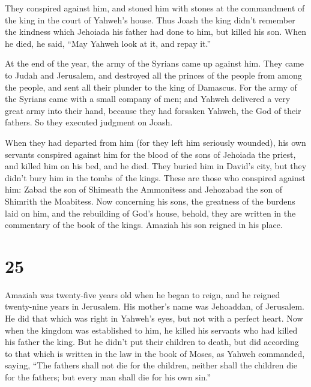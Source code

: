  They conspired against him, and stoned him with stones
at the commandment of the king in the court of Yahweh's house.
 Thus Joash the king didn't remember the kindness which
Jehoiada his father had done to him, but killed his son. When he died,
he said, ``May Yahweh look at it, and repay it.''

 At the end of the year, the army of the Syrians came up
against him. They came to Judah and Jerusalem, and destroyed all the
princes of the people from among the people, and sent all their plunder
to the king of Damascus.  For the army of the Syrians
came with a small company of men; and Yahweh delivered a very great army
into their hand, because they had forsaken Yahweh, the God of their
fathers. So they executed judgment on Joash.

 When they had departed from him (for they left him
seriously wounded), his own servants conspired against him for the blood
of the sons of Jehoiada the priest, and killed him on his bed, and he
died. They buried him in David's city, but they didn't bury him in the
tombs of the kings.  These are those who conspired
against him: Zabad the son of Shimeath the Ammonitess and Jehozabad the
son of Shimrith the Moabitess.  Now concerning his sons,
the greatness of the burdens laid on him, and the rebuilding of God's
house, behold, they are written in the commentary of the book of the
kings. Amaziah his son reigned in his place.

\hypertarget{section-24}{%
\section{25}\label{section-24}}

 Amaziah was twenty-five years old when he began to reign,
and he reigned twenty-nine years in Jerusalem. His mother's name was
Jehoaddan, of Jerusalem.  He did that which was right in
Yahweh's eyes, but not with a perfect heart.  Now when the
kingdom was established to him, he killed his servants who had killed
his father the king.  But he didn't put their children to
death, but did according to that which is written in the law in the book
of Moses, as Yahweh commanded, saying, ``The fathers shall not die for
the children, neither shall the children die for the fathers; but every
man shall die for his own sin.''

